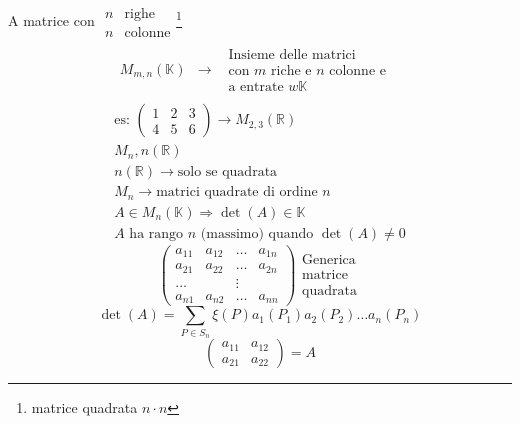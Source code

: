 A matrice con $
\begin{array}{|c|c}
  n & \text{righe}\\
  n & \text{colonne}
\end{array}
$\footnote{matrice quadrata $n\cdot n$}
\begin{eqnarray*}
 \begin{array}{ccc}
  M_{m,n}(\mathds{K})&\to&
                           \begin{array}{l}
                             \text{Insieme delle matrici}\\
                             \text{con $m$ riche e $n$ colonne e}\\
                             \text{a entrate $w\mathds{K}$}
                           \end{array}
 \end{array}\\
  \text{es: }
  \begin{pmatrix}
    1 & 2 & 3 \\
    4 & 5 & 6
  \end{pmatrix}\to M_{2,3}(\mathds{R})\\
  M_{n},n(\mathds{R})\\
  n(\mathds{R})\to \text{solo se quadrata}\\
  M_{n}\to \text{matrici quadrate di ordine } n\\
  \boxed{A\in M_n(\mathds{K})\Rightarrow \det(A)\in \mathds{K}}\\
  A \text{ ha rango } n \text{ (massimo) quando }\det(A)\neq 0
\end{eqnarray*}
\begin{equation*}
  \begin{pmatrix}
    a_{11} & a_{12} &\dots & a_{1n}\\
    a_{21} & a_{22} &\dots & a_{2n}\\
    \dots & &\vdots\\
    a_{n1} & a_{n2} &\dots & a_{nn} 
  \end{pmatrix}
  \begin{array}{c}
    \text{Generica}\\
    \text{matrice}\\
    \text{quadrata}
  \end{array}
\end{equation*}
\begin{equation*}
  \det(A)= \sum_{P\in S_n}\xi(P) a_1(P_1) a_2(P_2)\dots a_n (P_n)
\end{equation*}
\begin{equation*}
  \begin{pmatrix}
    a_{11} & a_{12}\\
    a_{21} & a_{22}
  \end{pmatrix}=A
\end{equation*}
